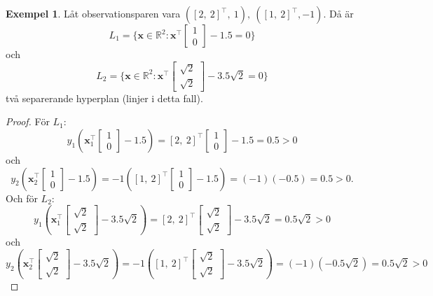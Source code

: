\documentclass[a4paper, 12pt]{report}
\theoremstyle{definition}
\newtheorem{ex}{Exempel}[section]
\theoremstyle{remark}
\begin{document}
\begin{ex}\label{exempel:mångahyperplan}
	Låt observationsparen vara $(\left[2,~2\right]^\intercal,~1),~(\left[1,~2\right]^\intercal,-1)$. Då är $$L_1=\{\mathbf{x}\in\mathbb{R}^2: \mathbf{x}^\intercal\begin{bmatrix}
	1\\
	0
	\end{bmatrix} - 1.5=0\}$$ och $$L_2=\{\mathbf{x}\in\mathbb{R}^2: \mathbf{x}^\intercal\begin{bmatrix}
	\sqrt{2}\\
	\sqrt{2}
	\end{bmatrix} - 3.5\sqrt{2}=0\}$$ två separerande hyperplan (linjer i detta fall).
\end{ex}
\begin{proof}
	För $L_1$: $$y_1(\mathbf{x}_1^\intercal\begin{bmatrix}
	1\\
	0\end{bmatrix}-1.5)=\left[2,~2\right]^\intercal\begin{bmatrix}
	1\\
	0\end{bmatrix}-1.5=0.5>0$$ och $$y_2(\mathbf{x}_2^\intercal\begin{bmatrix}
	1\\
	0\end{bmatrix}-1.5)=-1(\left[1,~2\right]^\intercal\begin{bmatrix}
	1\\
	0\end{bmatrix}-1.5)=(-1)(-0.5)=0.5>0.$$
	Och för $L_2$: $$y_1(\mathbf{x}_1^\intercal\begin{bmatrix}
	\sqrt{2}\\
	\sqrt{2}\end{bmatrix}-3.5\sqrt{2})=\left[2,~2\right]^\intercal\begin{bmatrix}
	\sqrt{2}\\
	\sqrt{2}\end{bmatrix}-3.5\sqrt{2}=0.5\sqrt{2}>0$$ och $$y_2(\mathbf{x}_2^\intercal\begin{bmatrix}
	\sqrt{2}\\
	\sqrt{2}\end{bmatrix}-3.5\sqrt{2})=-1(\left[1,~2\right]^\intercal\begin{bmatrix}
	\sqrt{2}\\
	\sqrt{2}\end{bmatrix}-3.5\sqrt{2})=(-1)(-0.5\sqrt{2})=0.5\sqrt{2}>0$$
\end{proof}
\end{document}
